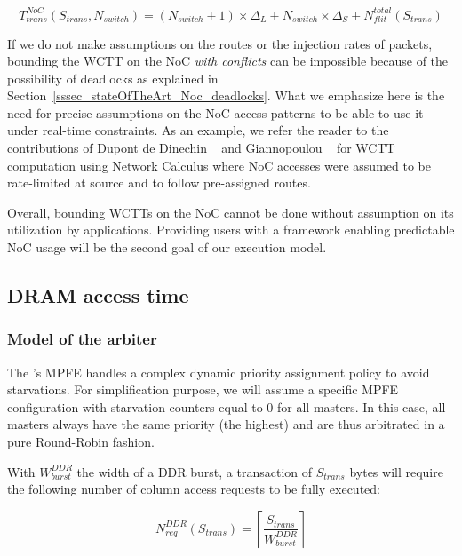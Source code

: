 \documentclass[main.tex]{subfiles}
\begin{document}
\begin{equation}
    T_{trans}^{NoC} (S_{trans} , N_{switch}) = 
    (N_{switch} + 1) \times \Delta_L +
    N_{switch}  \times \Delta_S +
    N_{flit}^{total} ( S_{trans} )
    \label{eq_execModel_NocTransNoConflict}
\end{equation}

If we do not make assumptions on the routes or the injection rates of packets, bounding the WCTT on the NoC \emph{with conflicts} can be impossible because of the possibility of deadlocks as explained in Section~\ref{sssec_stateOfTheArt_Noc_deadlocks}. What we emphasize here is the need for precise assumptions on the NoC access patterns to be able to use it under real-time constraints.
As an example, we refer the reader to the contributions of Dupont de Dinechin \etal~\cite{Dinechin2014} and Giannopoulou \etal~\cite{Giannopoulou2015} for WCTT computation using Network Calculus where NoC accesses were assumed to be rate-limited at source and to follow pre-assigned routes.

Overall, bounding WCTTs on the NoC cannot be done without assumption on its utilization by applications. Providing users with a framework enabling predictable NoC usage will be the second goal of our execution model.

\subsection{DRAM access time}
\label{ssec_execModel_DRAMaccessTime}
\subsubsection{Model of the arbiter}
The \mppalong's MPFE handles a complex dynamic priority assignment policy to avoid starvations. For simplification purpose, we will assume a specific MPFE configuration with starvation counters equal to 0 for all masters. In this case, all masters always have the same priority (the highest) and are thus arbitrated in a pure Round-Robin fashion.

With $W_{burst}^{DDR}$ the width of a DDR burst, a transaction of $S_{trans}$ bytes will require the following number of column access requests to be fully executed:

\begin{displaymath}
    N_{req}^{DDR}(S_{trans}) = \left\lceil \dfrac{S_{trans}}{W_{burst}^{DDR}} \right\rceil
\end{displaymath}
\end{document}
